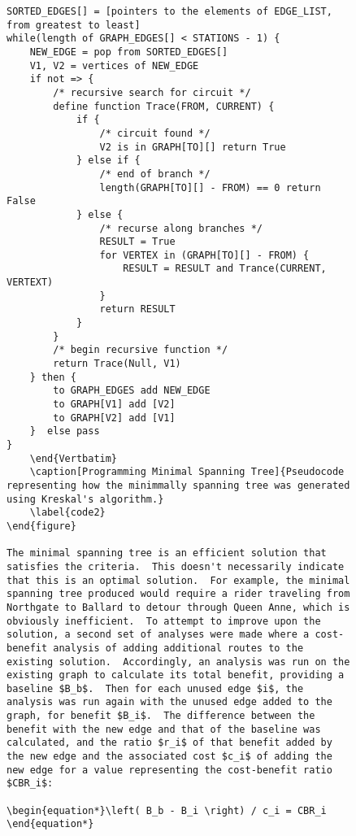 \documentclass{article}
\begin{document}
\begin{figure}[!hbp] 
    \begin{Verbatim}[frame=single] 
SORTED_EDGES[] = [pointers to the elements of EDGE_LIST, from greatest to least] 
while(length of GRAPH_EDGES[] < STATIONS - 1) {
    NEW_EDGE = pop from SORTED_EDGES[]
    V1, V2 = vertices of NEW_EDGE 
    if not => {
        /* recursive search for circuit */
        define function Trace(FROM, CURRENT) {
            if {
                /* circuit found */
                V2 is in GRAPH[TO][] return True
            } else if {
                /* end of branch */
                length(GRAPH[TO][] - FROM) == 0 return False
            } else {
                /* recurse along branches */
                RESULT = True 
                for VERTEX in (GRAPH[TO][] - FROM) {
                    RESULT = RESULT and Trance(CURRENT, VERTEXT)
                }
                return RESULT 
            }
        }
        /* begin recursive function */
        return Trace(Null, V1)
    } then {
        to GRAPH_EDGES add NEW_EDGE 
        to GRAPH[V1] add [V2] 
        to GRAPH[V2] add [V1] 
    }  else pass 
}
    \end{Vertbatim} 
    \caption[Programming Minimal Spanning Tree]{Pseudocode representing how the minimmally spanning tree was generated using Kreskal's algorithm.} 
    \label{code2} 
\end{figure} 

The minimal spanning tree is an efficient solution that satisfies the criteria.  This doesn't necessarily indicate that this is an optimal solution.  For example, the minimal spanning tree produced would require a rider traveling from Northgate to Ballard to detour through Queen Anne, which is obviously inefficient.  To attempt to improve upon the solution, a second set of analyses were made where a cost-benefit analysis of adding additional routes to the existing solution.  Accordingly, an analysis was run on the existing graph to calculate its total benefit, providing a baseline $B_b$.  Then for each unused edge $i$, the analysis was run again with the unused edge added to the graph, for benefit $B_i$.  The difference between the benefit with the new edge and that of the baseline was calculated, and the ratio $r_i$ of that benefit added by the new edge and the associated cost $c_i$ of adding the new edge for a value representing the cost-benefit ratio $CBR_i$:

\begin{equation*}\left( B_b - B_i \right) / c_i = CBR_i \end{equation*} 


\end{Verbatim}
\end{figure}
\end{document}

